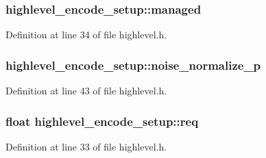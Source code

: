 \subsubsection[{\texorpdfstring{managed}{managed}}]{ highlevel\+\_\+encode\+\_\+setup\+::managed}\hypertarget{structhighlevel__encode__setup_a232b52aae5a1dc432c2fde0859a9de30}{}\label{structhighlevel__encode__setup_a232b52aae5a1dc432c2fde0859a9de30}


Definition at line 34 of file highlevel.\+h.

\subsubsection[{\texorpdfstring{noise\+\_\+normalize\+\_\+p}{noise_normalize_p}}]{ highlevel\+\_\+encode\+\_\+setup\+::noise\+\_\+normalize\+\_\+p}\hypertarget{structhighlevel__encode__setup_ab7b86cbf9e1b9eda7120da4063cae4d9}{}\label{structhighlevel__encode__setup_ab7b86cbf9e1b9eda7120da4063cae4d9}


Definition at line 43 of file highlevel.\+h.

\subsubsection[{\texorpdfstring{req}{req}}]{\setlength{\rightskip}{0pt plus 5cm}float highlevel\+\_\+encode\+\_\+setup\+::req}\hypertarget{structhighlevel__encode__setup_a77cd5d92231c63d5d29d34a49a055014}{}\label{structhighlevel__encode__setup_a77cd5d92231c63d5d29d34a49a055014}


Definition at line 33 of file highlevel.\+h.

